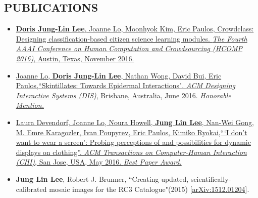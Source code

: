 \documentclass{res}
\begin{document}
\begin{resume}
\section{PUBLICATIONS}
\begin{itemize}
\item \href{http://dorisjunglinlee.com/files/crowdclass.pdf}{\textbf{Doris Jung-Lin Lee}, Joanne Lo, Moonhyok Kim, Eric Paulos, Crowdclass: Designing classification-based citizen science learning modules. \textit{The Fourth AAAI Conference on Human Computation and Crowdsourcing (HCOMP 2016)}, Austin, Texas, November 2016.}
\item \href{http://dl.acm.org/citation.cfm?id=2901885&CFID=765226474&CFTOKEN=46922780}{Joanne Lo, \textbf{Doris Jung-Lin Lee}, Nathan Wong, David Bui, Eric Paulos,``Skintillates: Towards Epidermal Interactions".  \textit{ACM Designing Interactive Systems (DIS)}, Brisbane, Australia, June 2016. \textit{Honorable Mention.}}
\item \href{http://dl.acm.org/citation.cfm?id=2858192&CFID=765226474&CFTOKEN=46922780}{Laura Devendorf, Joanne Lo, Noura Howell, \textbf{Jung Lin Lee}, Nan-Wei Gong, M. Emre Karagozler, Ivan  Poupyrev, Eric Paulos, Kimiko Ryokai,``\hspace{1pt}`I don’t want to wear a screen': Probing perceptions of and  possibilities for dynamic displays on clothing''. \textit{ACM Transactions on Computer-Human Interaction (CHI)}, San Jose, USA, May 2016. \textit{Best Paper Award.}}
\item \textbf{Jung Lin Lee}, Robert J. Brunner, ``Creating updated, scientifically-calibrated mosaic images for the RC3 Catalogue"(2015) [\href{http://arxiv.org/abs/1512.01204}{arXiv:1512.01204}]. 
\end{itemize}

\end{resume}
\end{document}
